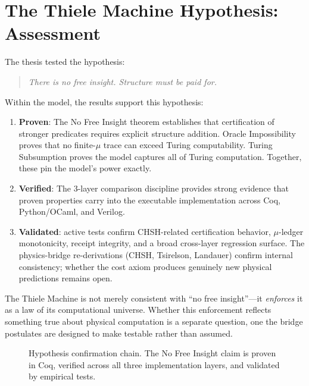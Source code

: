 \section{The Thiele Machine Hypothesis: Assessment}

The thesis tested the hypothesis:
\begin{quote}
\textit{There is no free insight. Structure must be paid for.}
\end{quote}

Within the model, the results support this hypothesis:

\begin{enumerate}
    \item \textbf{Proven}: The No Free Insight theorem establishes that certification of stronger predicates requires explicit structure addition. Oracle Impossibility proves that no finite-$\mu$ trace can exceed Turing computability. Turing Subsumption proves the model captures all of Turing computation. Together, these pin the model's power exactly.
    
    \item \textbf{Verified}: The 3-layer comparison discipline provides strong evidence that proven properties carry into the executable implementation across Coq, Python/OCaml, and Verilog.
    
    \item \textbf{Validated}: active tests confirm CHSH-related certification behavior, $\mu$-ledger monotonicity, receipt integrity, and a broad cross-layer regression surface. The physics-bridge re-derivations (CHSH, Tsirelson, Landauer) confirm internal consistency; whether the cost axiom produces genuinely new physical predictions remains open.
\end{enumerate}

The Thiele Machine is not merely consistent with ``no free insight''---it \textit{enforces} it as a law of its computational universe. Whether this enforcement reflects something true about physical computation is a separate question, one the bridge postulates are designed to make testable rather than assumed.

\begin{figure}[ht]
\centering
{}
\caption{Hypothesis confirmation chain. The No Free Insight claim is proven in Coq, verified across all three implementation layers, and validated by empirical tests.}
\label{fig:ch8-hypothesis}
\end{figure}


